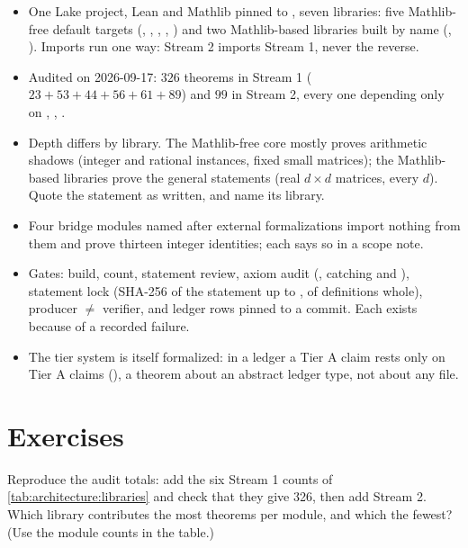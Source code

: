 \begin{summarybox}
\begin{itemize}[leftmargin=*,itemsep=1pt]
\item One Lake project, Lean and Mathlib pinned to , seven libraries: five
  Mathlib-free default targets (,
  , , ,
  ) and two Mathlib-based libraries built by name
  (, ). Imports run one way:
  Stream 2 imports Stream 1, never the reverse.
\item Audited on 2026-09-17: $326$ theorems in Stream 1 ($23+53+44+56+61+89$) and $99$ in
  Stream 2, every one depending only on , ,
  .
\item Depth differs by library. The Mathlib-free core mostly proves arithmetic shadows
  (integer and rational instances, fixed small matrices); the Mathlib-based libraries prove
  the general statements (real $d\times d$ matrices, every $d$). Quote the statement as
  written, and name its library.
\item Four bridge modules named after external formalizations import nothing from them and
  prove thirteen integer identities; each says so in a scope note.
\item Gates: build,  count, statement review, axiom audit
  (, catching  and ), statement
  lock (SHA-256 of the statement up to \lean{:=}, of definitions whole), producer $\ne$
  verifier, and ledger rows pinned to a commit. Each exists because of a recorded failure.
\item The tier system is itself formalized: in a  ledger a Tier A claim rests
  only on Tier A claims (), a theorem about an
  abstract ledger type, not about any file.
\end{itemize}
\end{summarybox}

\section*{Exercises}

\begin{exercise}[$\star$]
Reproduce the audit totals: add the six Stream 1 counts of
\cref{tab:architecture:libraries} and check that they give 326, then add Stream 2. Which
library contributes the most theorems per module, and which the fewest? (Use the module
counts in the table.)
\end{exercise}

